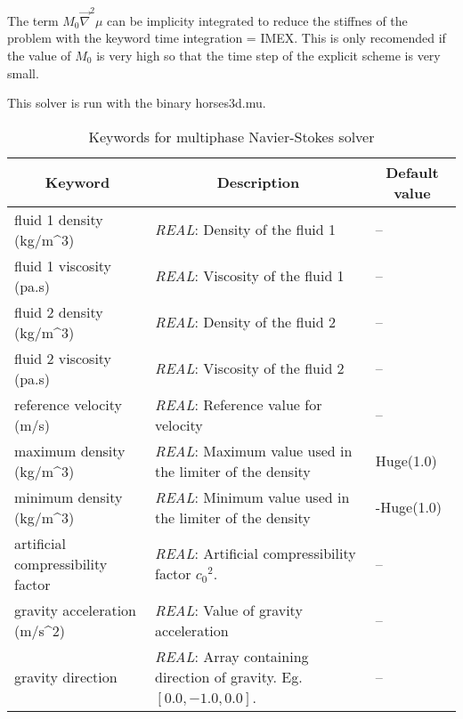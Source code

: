 \documentclass[a4paper,10pt]{report}
\begin{document}
The term $M_0 \vec{\nabla}^2 \mu$ can be implicity integrated to reduce the stiffnes of the problem with the keyword time integration = IMEX. This is only recomended if the value of $M_0$ is very high so that the time step of the explicit scheme is very small. 

This solver is run with the binary horses3d.mu. 

\begin{table}[htbp]
    \caption{Keywords for multiphase Navier-Stokes solver}
    \begin{tabular}{|l|p{10cm}|p{2.2cm}|}
    \hline
    \multicolumn{1}{|c|}{Keyword} & \multicolumn{1}{c|}{Description} & \multicolumn{1}{c|}{Default value} \\ \hline
    fluid 1 density (kg/m\^{}3)           & \textit{REAL}: Density of the fluid 1 & -- \\ \hline
    fluid 1 viscosity (pa.s)           & \textit{REAL}: Viscosity of the fluid 1 & -- \\ \hline     
    fluid 2 density (kg/m\^{}3)           & \textit{REAL}: Density of the fluid 2 & -- \\ \hline
    fluid 2 viscosity (pa.s)           & \textit{REAL}: Viscosity of the fluid 2  & -- \\ \hline         
    reference velocity (m/s)            & \textit{REAL}: Reference value for velocity                                                                                              & -- \\ \hline                                           
    maximum density (kg/m\^{}3)            & \textit{REAL}: Maximum value used in the limiter of the density                                                                       &  Huge(1.0) \\ \hline
    minimum density (kg/m\^{}3)            & \textit{REAL}: Minimum value used in the limiter of the density                                                                       & -Huge(1.0) \\ \hline
    artificial compressibility factor   & \textit{REAL}: Artificial compressibility factor ${c_0}^2$.                                                                              & -- \\ \hline
    gravity acceleration (m/s\^{}2)        & \textit{REAL}: Value of gravity acceleration                                                                                          & -- \\ \hline
    gravity direction                   & \textit{REAL}: Array containing direction of gravity. Eg. $[0.0,-1.0,0.0]$.                                                              & -- \\ \hline

\end{tabular}
\end{table}
\end{document}
